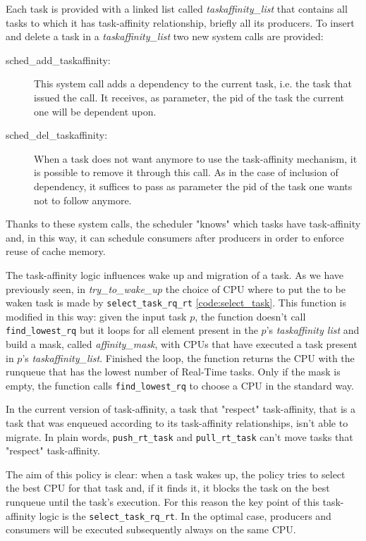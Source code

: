 Each task is provided with a linked list called \textit{taskaffinity\_list} that contains all tasks to which it has task-affinity relationship, briefly 
all its producers. To insert and delete a task in a \textit{taskaffinity\_list} two new system calls are provided:

\begin{description}

\item[sched\_add\_taskaffinity:] This system call adds a dependency to the current task, i.e. the task that issued the call. It receives, as parameter, the 
pid of the task the current one will be dependent upon.

\item[sched\_del\_taskaffinity:] When a task does not want anymore to use the task-affinity mechanism, it is possible to remove it through this call.
As in the case of inclusion of dependency, it suffices to pass as parameter the pid of the task one wants not to follow anymore.

\end{description}

Thanks to these system calls, the scheduler "knows" which tasks have task-affinity and, in this way, it can schedule consumers after producers in order to 
enforce reuse of cache memory.

The task-affinity logic influences wake up and migration of a task. As we have
previously seen, in \textit{try\_to\_wake\_up} the choice of CPU where to 
put the to be waken task is made by \texttt{select\_task\_rq\_rt} \ref{code:select_task}. This function is modified in this way: given the input task $p$, 
the function doesn't call \texttt{find\_lowest\_rq} but it loops for all element present in the $p$'s \textit{taskaffinity list} and build a mask, called 
\textit{affinity\_mask}, with CPUs that have executed a task present in $p$'s
\textit{taskaffinity\_list}. Finished the loop, the function returns the CPU 
with the runqueue that has the lowest number of Real-Time tasks. Only if the
mask is empty, the function calls \texttt{find\_lowest\_rq} to choose a CPU
in the standard way. 

In the current version of task-affinity, a task that "respect" task-affinity, that is a task that was enqueued according to its task-affinity 
relationships, isn't able to migrate. In plain words, \texttt{push\_rt\_task} and \texttt{pull\_rt\_task} can't move tasks that "respect" task-affinity.

The aim of this policy is clear: when a task wakes up, the policy tries to
select the best CPU for that task and, if it finds it, it blocks the task on the 
best runqueue until the task's execution. For this reason the key point of this task-affinity logic is the \texttt{select\_task\_rq\_rt}. In the optimal 
case, producers and consumers will be executed subsequently always on the same
CPU.

